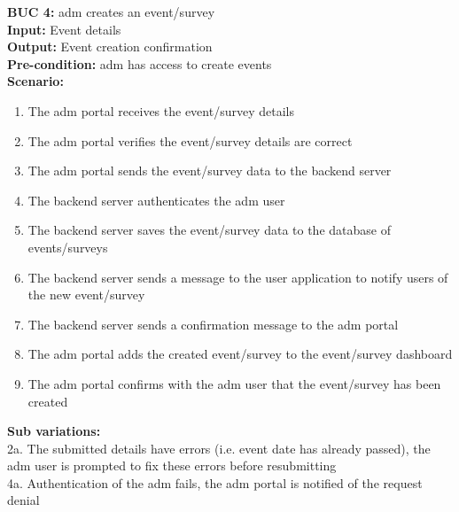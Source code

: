 \documentclass[12pt]{article}
\begin{document}
\noindent\textbf{BUC 4: } \Gls{adm} creates an event/survey \\
\textbf{Input:} Event details \\
\textbf{Output:} Event creation confirmation \\
\textbf{Pre-condition:} \Gls{adm} has access to create events \\
\textbf{Scenario:} \\
\begin{enumerate}
  \item The \gls{adm} portal receives the event/survey details
  \item The \gls{adm} portal verifies the event/survey details are correct
  \item The \gls{adm} portal sends the event/survey data to the backend server
  \item The backend server authenticates the \gls{adm} user
  \item The backend server saves the event/survey data to the database of events/surveys
  \item The backend server sends a message to the user application to notify users of the new event/survey
  \item The backend server sends a confirmation message to the \gls{adm} portal
  \item The \gls{adm} portal adds the created event/survey to the event/survey dashboard
  \item The \gls{adm} portal confirms with the \gls{adm} user that the event/survey has been created
\end{enumerate}
\textbf{Sub variations:} \\
2a. The submitted details have errors (i.e. event date has already passed), the \gls{adm} user is prompted to fix these errors before resubmitting \\
4a. Authentication of the \gls{adm} fails, the \gls{adm} portal is notified of the request denial \\
\end{document}
